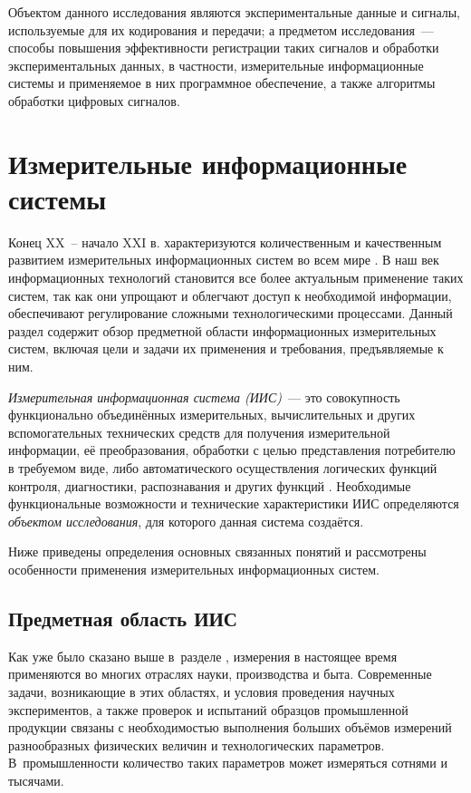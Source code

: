 \documentclass[a4paper, 14pt, titlepage]{extarticle}
\newcommand{\term}[1]{\emph{#1}}
\let\oldsection\section
\renewcommand{\section}{\newpage\oldsection}
\begin{document}
  Объектом данного исследования являются экспериментальные данные и сигналы, используемые для их
  кодирования и передачи; а предметом исследования~--- способы повышения эффективности регистрации
  таких сигналов и обработки экспериментальных данных, в частности, измерительные информационные
  системы и применяемое в них программное обеспечение, а также алгоритмы обработки цифровых сигналов.

  \section{Измерительные информационные системы}\label{sec:iis}

  Конец XX~-- начало XXI в. характеризуются количественным и качественным развитием измерительных
  информационных систем во всем мире \cite[с.~3]{rannev-iis}. В наш век информационных
  технологий становится все более актуальным применение таких систем, так как они упрощают и облегчают доступ
  к необходимой информации, обеспечивают регулирование сложными технологическими процессами.
  Данный раздел содержит обзор предметной области информационных измерительных систем, включая цели
  и задачи их применения и требования, предъявляемые к ним.

  \term{Измерительная информационная система (ИИС)}~--- это совокупность функционально объединённых
  измерительных, вычислительных и других вспомогательных технических средств для получения
  измерительной информации, её преобразования, обработки с целью представления потребителю в
  требуемом виде, либо автоматического осуществления логических функций контроля, диагностики,
  распознавания и других функций \cite[с.~9]{volkov-iis}.
  Необходимые функциональные возможности и технические характеристики ИИС определяются
  \term{объектом исследования}, для которого данная система создаётся.

  Ниже приведены определения основных связанных понятий и рассмотрены особенности применения
  измерительных информационных систем.

  \subsection{Предметная область ИИС}

  Как уже было сказано выше в~разделе , измерения в настоящее время применяются
  во многих отраслях науки, производства и быта. Современные задачи, возникающие в этих областях,
  и условия проведения научных экспериментов, а также проверок и испытаний образцов промышленной
  продукции связаны с необходимостью выполнения
  больших объёмов измерений разнообразных физических величин и технологических параметров.
  В~промышленности количество таких параметров может измеряться сотнями и тысячами.
\end{document}
